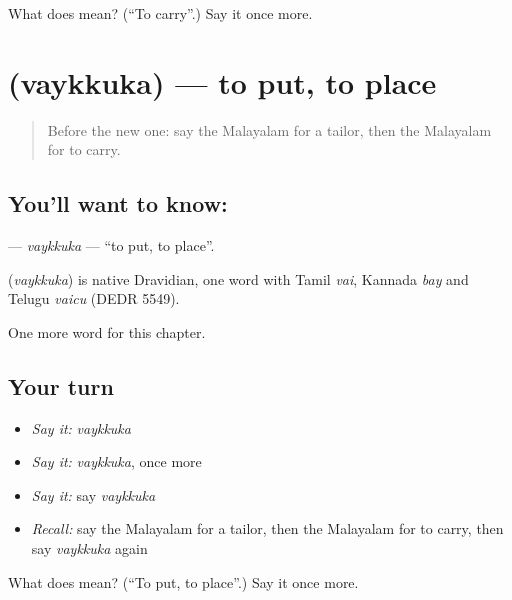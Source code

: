 \begin{tcolorbox}[breakable,colback=teal!4,colframe=teal!35!black,title={Before you move on}]
What does  mean? (\textquotedblleft{}To carry\textquotedblright{}.) Say it once more.
\end{tcolorbox}
\section[\texorpdfstring{\ml{വയ്ക്കുക} (vaykkuka)}{വയ്ക്കുക (vaykkuka)}]{ (vaykkuka) — to put, to place}

\label{lesson:ML-C223-vaykkuka}



\begin{quote}
Before the new one: say the Malayalam for a tailor, then the Malayalam for to carry.
\end{quote}

\subsection*{You'll want to know: }
\textbf{} — \emph{vaykkuka} — \textquotedblleft{}to put, to place\textquotedblright{}.

\begin{cousinweb}
\textbf{} (\emph{vaykkuka}) is native Dravidian, one word with Tamil \emph{vai}, Kannada \emph{bay} and Telugu \emph{vaicu} (DEDR 5549).
\end{cousinweb}

\begin{grammarlens}[title={What you've built}]
One more word for this chapter.
\end{grammarlens}

\subsection*{Your turn}
\begin{itemize}
\raggedright
  \item \emph{Say it:} \emph{vaykkuka}
  \item \emph{Say it:} \emph{vaykkuka}, once more
  \item \emph{Say it:} say \emph{vaykkuka}
  \item \emph{Recall:} say the Malayalam for a tailor, then the Malayalam for to carry, then say \emph{vaykkuka} again
\end{itemize}

\begin{tcolorbox}[breakable,colback=teal!4,colframe=teal!35!black,title={Before you move on}]
What does  mean? (\textquotedblleft{}To put, to place\textquotedblright{}.) Say it once more.
\end{tcolorbox}

